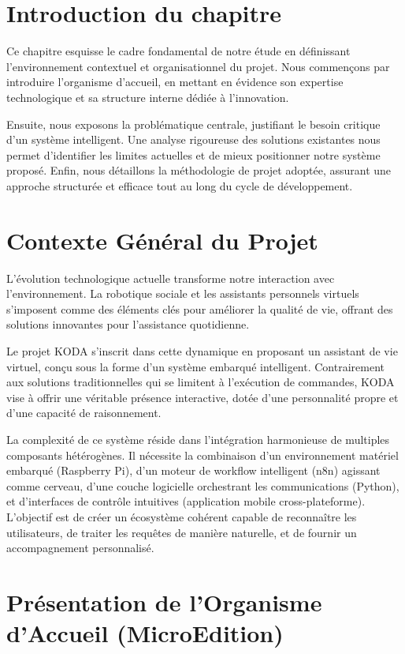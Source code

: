 \documentclass[a4paper,12pt]{report}
\newcommand{\sectiontitle}[1]{\needspace{4\baselineskip}\section{#1}}
\begin{document}
	\section{Introduction du chapitre}
	
	Ce chapitre esquisse le cadre fondamental de notre étude en définissant l'environnement contextuel et organisationnel du projet. Nous commençons par introduire l'organisme d'accueil, en mettant en évidence son expertise technologique et sa structure interne dédiée à l'innovation.
	
	Ensuite, nous exposons la problématique centrale, justifiant le besoin critique d'un système intelligent. Une analyse rigoureuse des solutions existantes nous permet d'identifier les limites actuelles et de mieux positionner notre système proposé. Enfin, nous détaillons la méthodologie de projet adoptée, assurant une approche structurée et efficace tout au long du cycle de développement.
	
	\sectiontitle{Contexte Général du Projet}
	
	L’évolution technologique actuelle transforme notre interaction avec l'environnement. La robotique sociale et les assistants personnels virtuels s'imposent comme des éléments clés pour améliorer la qualité de vie, offrant des solutions innovantes pour l'assistance quotidienne.
	
	Le projet KODA s'inscrit dans cette dynamique en proposant un assistant de vie virtuel, conçu sous la forme d'un système embarqué intelligent. Contrairement aux solutions traditionnelles qui se limitent à l'exécution de commandes, KODA vise à offrir une véritable présence interactive, dotée d'une personnalité propre et d'une capacité de raisonnement.
	
	La complexité de ce système réside dans l'intégration harmonieuse de multiples composants hétérogènes. Il nécessite la combinaison d'un environnement matériel embarqué (Raspberry Pi), d'un moteur de workflow intelligent (n8n) agissant comme cerveau, d'une couche logicielle orchestrant les communications (Python), et d'interfaces de contrôle intuitives (application mobile cross-plateforme). L'objectif est de créer un écosystème cohérent capable de reconnaître les utilisateurs, de traiter les requêtes de manière naturelle, et de fournir un accompagnement personnalisé.
	
	\sectiontitle{Présentation de l'Organisme d'Accueil (MicroEdition)}
	
\end{document}

